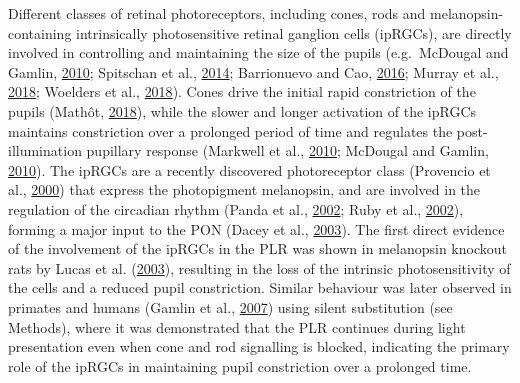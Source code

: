 \documentclass[
]{article}
\begin{document}
Different classes of retinal photoreceptors, including cones, rods and melanopsin-containing intrinsically photosensitive retinal ganglion cells (ipRGCs), are directly involved in controlling and maintaining the size of the pupils (e.g.~McDougal and Gamlin, \protect\hyperlink{ref-McDougal2010}{2010}; Spitschan et al., \protect\hyperlink{ref-Spitschan2014}{2014}; Barrionuevo and Cao, \protect\hyperlink{ref-Barrionuevo2016}{2016}; Murray et al., \protect\hyperlink{ref-Murray2018}{2018}; Woelders et al., \protect\hyperlink{ref-Woelders2018}{2018}). Cones drive the initial rapid constriction of the pupils (Mathôt, \protect\hyperlink{ref-Mathot2018}{2018}), while the slower and longer activation of the ipRGCs maintains constriction over a prolonged period of time and regulates the post-illumination pupillary response (Markwell et al., \protect\hyperlink{ref-Markwell2010}{2010}; McDougal and Gamlin, \protect\hyperlink{ref-McDougal2010}{2010}). The ipRGCs are a recently discovered photoreceptor class (Provencio et al., \protect\hyperlink{ref-Provencio2000}{2000}) that express the photopigment melanopsin, and are involved in the regulation of the circadian rhythm (Panda et al., \protect\hyperlink{ref-Panda2002}{2002}; Ruby et al., \protect\hyperlink{ref-Ruby2002}{2002}), forming a major input to the PON (Dacey et al., \protect\hyperlink{ref-Dacey2003}{2003}). The first direct evidence of the involvement of the ipRGCs in the PLR was shown in melanopsin knockout rats by Lucas et al. (\protect\hyperlink{ref-Lucas2003}{2003}), resulting in the loss of the intrinsic photosensitivity of the cells and a reduced pupil constriction. Similar behaviour was later observed in primates and humans (Gamlin et al., \protect\hyperlink{ref-Gamlin2007}{2007}) using silent substitution (see Methods), where it was demonstrated that the PLR continues during light presentation even when cone and rod signalling is blocked, indicating the primary role of the ipRGCs in maintaining pupil constriction over a prolonged time.
\end{document}
